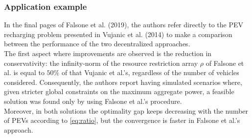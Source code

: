 \subsubsection{Application example}
In the final pages of Falsone et al. (2019)\supercite{falsone}, the authors refer directly to the PEV recharging problem presented in Vujanic et al. (2014)\supercite{vujanic} to make a comparison between the performance of the two decentralized approaches.\\
The first aspect where improvements are observed is the reduction in conservativity: the infinity-norm of the resource restriction array $\rho$ of Falsone et al. is equal to $50\%$ of that Vujanic et al.'s, regardless of the number of vehicles considered. Consequently, the authors report having simulated scenarios where, given stricter global constraints on the maximum aggregate power, a feasible solution was found only by using Falsone et al.'s procedure.\\
Moreover, in both solutions the optimality gap keeps decreasing with the number of PEVs according to \ref{eq:ratio}, but the convergence is faster in Falsone et al.'s approach.\\